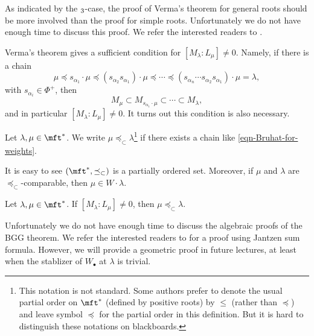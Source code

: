 \begin{rem}
	As indicated by the $\sl_3$-case, the proof of Verma's theorem for general roots should be more involved than the proof for simple roots. Unfortunately we do not have enough time to discuss this proof. We refer the interested readers to \cite[Sect. 4.5-4.7]{H}.
\end{rem}

	Verma's theorem gives a sufficient condition for $[M_\lambda:L_\mu]\neq0$. Namely, if there is a chain 
	\begin{equation}
		\label{eqn-Bruhat-for-weights}
		\mu \preceq s_{\alpha_1}\cdot \mu \preceq (s_{\alpha_2}s_{\alpha_1})\cdot \mu \preceq \cdots \preceq (s_{\alpha_n} \cdots s_{\alpha_2}s_{\alpha_1})\cdot \mu = \lambda,
	\end{equation}
	with $s_{\alpha_i}\in \Phi^+$, then 
	\[
		M_\mu \subset M_{s_{\alpha_1}\cdot \mu} \subset \cdots \subset M_\lambda,
	\]
	and in particular $[M_\lambda: L_\mu] \neq 0$. It turns out this condition is also necessary.

\begin{defn}
	Let $\lambda,\mu \in \mft^*$. We write $\mu\preceq_\subset \lambda$\footnote{This notation is not standard. Some authors prefer to denote the usual partial order on $\mft^*$ (defined by positive roots) by $\le$ (rather than $\preceq$) and leave symbol $\preceq$ for the partial order in this definition. But it is hard to distinguish these notations on blackboards.} if there exists a chain like \eqref{eqn-Bruhat-for-weights}.
\end{defn}

\begin{rem}
	It is easy to see $(\mft^*, \preceq_\subset)$ is a partially ordered set. Moreover, if $\mu$ and $\lambda$ are $\preceq_\subset$-comparable, then $\mu \in W\cdot \lambda$.
\end{rem}

\begin{thm}[BGG]
	\label{thm-BGG}
	Let $\lambda,\mu \in \mft^*$. If $[M_\lambda:L_\mu]\neq0$, then $\mu \preceq_\subset \lambda$.
\end{thm}

\begin{rem}
	Unfortunately we do not have enough time to discuss the algebraic proofs of the BGG theorem. We refer the interested readers to \cite[Sect. 5]{H} for a proof using Jantzen sum formula. However, we will provide a geometric proof in future lectures, at least when the stablizer of $W_\bullet$ at $\lambda$ is trivial.
\end{rem}

